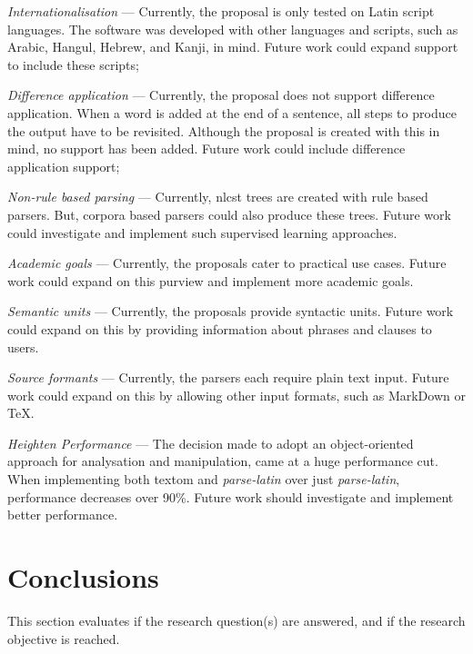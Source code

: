 \begin{aenumerate}
\item\emph{Internationalisation} --- Currently, the proposal is only
    tested on Latin script languages.
  The software was developed with other languages and scripts, such as
    Arabic, Hangul, Hebrew, and Kanji, in mind.
  Future work could expand support to include these scripts;
\item\emph{Difference application} --- Currently, the proposal does not
    support difference application.
  When a word is added at the end of a sentence, all steps to produce the
    output have to be revisited.
  Although the proposal is created with this in mind, no support has been
    added.
  Future work could include difference application support;
\item\emph{Non-rule based parsing} --- Currently, \gls{nlcst} trees are
    created with rule based parsers.
  But, corpora based parsers could also produce these trees.
  Future work could investigate and implement such supervised learning
    approaches.
\item\emph{Academic goals} --- Currently, the proposals cater to practical use
    cases.
  Future work could expand on this purview and implement more academic
    goals.
\item\emph{Semantic units} --- Currently, the proposals provide syntactic
    units.
  Future work could expand on this by providing information about phrases
    and clauses to users.
\item\emph{Source formants} --- Currently, the parsers each require plain
    text input.
  Future work could expand on this by allowing other input formats, such as
    MarkDown or \TeX.
\item\emph{Heighten Performance} --- The decision made to adopt an
    object-oriented approach for analysation and manipulation, came at a huge
    performance cut.
  When implementing both \gls{textom} and \emph{parse-latin} over just
    \emph{parse-latin}, performance decreases over 90\%.
  Future work should investigate and implement better performance.
\end{aenumerate}

\section{Conclusions}\label{conclusions}

This section evaluates if the research question(s) are answered, and if the
  research objective is reached.

